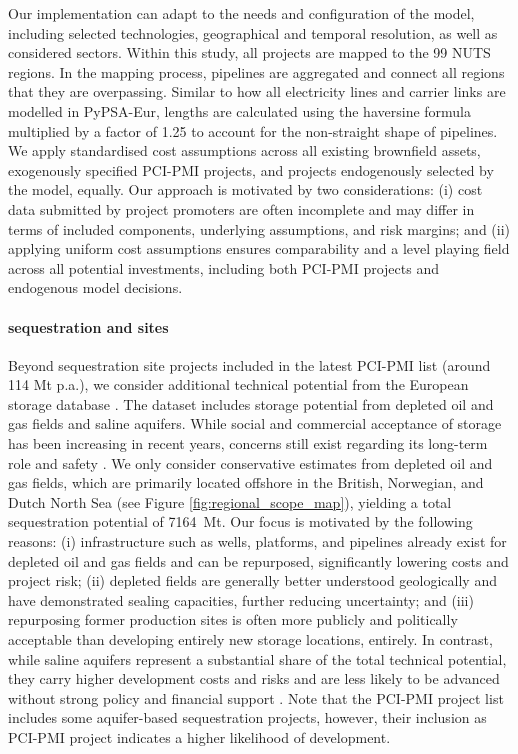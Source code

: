 \documentclass[final,5p,times,twocolumn,sort&compress]{elsarticle}
\begin{document}
Our implementation can adapt to the needs and configuration of the model, including selected technologies, geographical and temporal resolution, as well as considered sectors. Within this study, all projects are mapped to the 99 NUTS regions. In the mapping process, pipelines are aggregated and connect all regions that they are overpassing. Similar to how all electricity lines and carrier links are modelled in PyPSA-Eur, lengths are calculated using the haversine formula multiplied by a factor of 1.25 to account for the non-straight shape of pipelines.
We apply standardised cost assumptions \cite{zeyenPyPSATechnologydataV01012025} across all existing brownfield assets, exogenously specified PCI-PMI projects, and projects endogenously selected by the model, equally. Our approach is motivated by two considerations: (i) cost data submitted by project promoters are often incomplete and may differ in terms of included components, underlying assumptions, and risk margins; and (ii) applying uniform cost assumptions ensures comparability and a level playing field across all potential investments, including both PCI-PMI projects and endogenous model decisions.

\paragraph{ sequestration and  sites}
\label{sec:co2_sequestration_sites}
Beyond  sequestration site projects included in the latest PCI-PMI list (around 114 Mt p.a.), we consider additional technical potential from the European  storage database \cite{europeancommissionEuropeanCO2Storage2020,hofmannH2CO2Network2025}. The dataset includes storage potential from depleted oil and gas fields and saline aquifers. While social and commercial acceptance of  storage has been increasing in recent years, concerns still exist regarding its long-term role and safety \cite{vanalphenSocietalAcceptanceCarbon2007}.
We only consider conservative estimates from depleted oil and gas fields, which are primarily located offshore in the British, Norwegian, and Dutch North Sea (see Figure \ref{fig:regional_scope_map}), yielding a total sequestration potential of \SI{7164}{Mt}. Our focus is motivated by the following reasons: (i) infrastructure such as wells, platforms, and pipelines already exist for depleted oil and gas fields and can be repurposed, significantly lowering costs and project risk; (ii) depleted fields are generally better understood geologically and have demonstrated sealing capacities, further reducing uncertainty; and (iii) repurposing former production sites is often more publicly and politically acceptable than developing entirely new storage locations, entirely. In contrast, while saline aquifers represent a substantial share of the total technical potential, they carry higher development costs and risks and are less likely to be advanced without strong policy and financial support \cite{europeancommissionEuropeanCO2Storage2020}. Note that the PCI-PMI project list includes some aquifer-based sequestration projects, however, their inclusion as PCI-PMI project indicates a higher likelihood of development.
\end{document}
